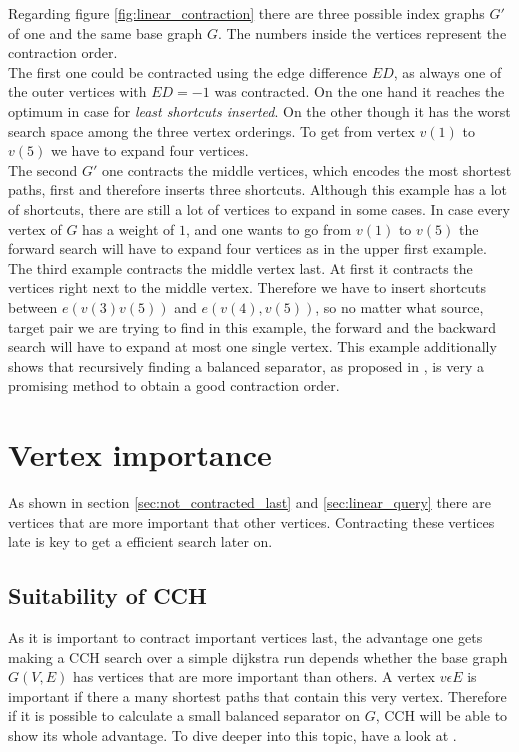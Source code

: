Regarding figure \ref{fig:linear_contraction} there are three possible index graphs $G'$ of one and the same base graph $G$. The numbers inside the vertices represent the contraction order.
\\
The first one could be contracted using the edge difference $ED$, as always one of the outer vertices with $ED=-1$ was contracted. On the one hand it reaches the optimum in case for \textit{least shortcuts inserted}. On the other though it has the worst search space among the three vertex orderings. 
To get from vertex $v(1)$ to $v(5)$ we have to expand four vertices. 
\\
The second $G'$ one contracts the middle vertices, which encodes the most shortest paths, first and therefore inserts three shortcuts. Although this example has a lot of shortcuts, there are still a lot of vertices to expand in some cases. In case every vertex of $G$ has a weight of $1$, and one wants to go from $v(1)$ to $v(5)$ the forward search will have to expand four vertices as in the upper first example.
\\
The third example contracts the middle vertex last. At first it contracts the vertices right next to the middle vertex. Therefore we have to insert shortcuts between $e(v(3)v(5))$ and $e(v(4), v(5))$,
so no matter what source, target pair we are trying to find in this example, the forward and the backward search will have to expand at most one single vertex. This example additionally shows that
recursively finding a balanced separator, as proposed in \cite[Customization Contraction Hierarchies]{CCH}, is very a promising method to obtain a good contraction order. 

\section{Vertex importance}\label{sec:vertex_importance}

As shown in section \ref{sec:not_contracted_last} and \ref{sec:linear_query} there are vertices that are more important that other vertices. Contracting these vertices late is key to get a efficient search later on. 

\subsection{Suitability of CCH}

As it is important to contract important vertices last, the advantage one gets making a CCH search over a simple dijkstra run depends whether the base graph $G(V, E)$ has vertices that are more important than others. 
A vertex $v \epsilon E$ is important if there a many shortest paths that contain this very vertex. Therefore if it is possible to calculate a small balanced separator on $G$, CCH will be able to show its 
whole advantage. To dive deeper into this topic, have a look at \cite[Lower Bounds and Approximation Algorithms for Search Space Sizes in Contraction Hierarchies]{BlumStorandt}.

